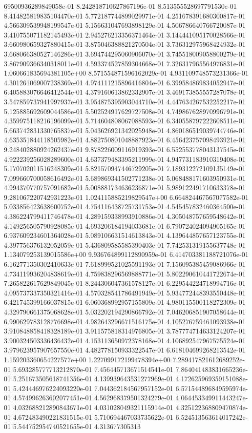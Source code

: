 69500936289849058e-01	8.242818710627867196e-01	8.513555528697791530e-01	8.414825819835104470e-01	5.772187744899029971e-01	4.251678391680300817e-01	4.566309539948199547e-01	5.156631047693898129e-01	4.506786640766720087e-01	3.410755071182145493e-01	2.945276213356371464e-01	3.144441095170028566e-01	3.660980659327880415e-01	3.875046388821270504e-01	3.736312975968424932e-01	3.668066380527146286e-01	3.694744295060906070e-01	3.745518009058800279e-01	3.867909366340318011e-01	4.593374527859304668e-01	7.326317965564976831e-01	1.060661835694381105e+00	8.571554871596162029e-01	4.931109748573231366e-01	4.301261069007238369e-01	4.974111215896416804e-01	6.399584869834052947e-01	6.405883076646412544e-01	4.379160613862332907e-01	3.469173855557287078e-01	3.547859737941997937e-01	3.954875395903044710e-01	4.447634267532252217e-01	5.125885692609044586e-01	5.502524917629727508e-01	4.749867628970996791e-01	4.359975118216196099e-01	5.714604808067088593e-01	6.340558797222608511e-01	5.663742831330765837e-01	5.043626921342025948e-01	4.860186519039744746e-01	4.635351844118505982e-01	4.882750801048887923e-01	6.456423757098493921e-01	9.248402880924262437e-01	9.878226009116919393e-01	6.552553778043137545e-01	4.922239256028289600e-01	4.637379483395211999e-01	4.947731183910319408e-01	5.170702011516248309e-01	5.821570947446729205e-01	7.189312272109135149e-01	7.099660700058616492e-01	5.689869341502771238e-01	5.068488171603950931e-01	4.994370770757091682e-01	5.008881734636236871e-01	5.989122491710633378e-01	9.281067220742931223e-01	1.024115885219829547e+00	6.664824467567077582e-01	5.033856423638600752e-01	4.754116438725731753e-01	4.545457832460364500e-01	4.386224799411746478e-01	4.289159338993910886e-01	4.305048757659548642e-01	4.149256505790928085e-01	4.693206184194033681e-01	6.790724024094905165e-01	6.937609234601364028e-01	5.089106631514613843e-01	4.139644857657123755e-01	4.397756376132052059e-01	5.436809585585390403e-01	7.742531319155637748e-01	1.134079253139015586e+00	9.936764899112890959e-01	6.414703381188721076e-01	6.162771350302410633e-01	7.618999521025591193e-01	7.156095385459086966e-01	4.734119936204838619e-01	4.759838296569888771e-01	5.802290610441722674e-01	7.265822617629849045e-01	8.244306047361578127e-01	6.229544224718994716e-01	4.095737337350321416e-01	4.570328541786491949e-01	5.934772448393550448e-01	6.421745399166037815e-01	6.060368992957155809e-01	4.980115500118272309e-01	4.329790661375068628e-01	5.032202194290866792e-01	7.046206851907058644e-01	6.990629783128776698e-01	4.982643296671516175e-01	4.105276759461093938e-01	3.910848858418328189e-01	3.911575818314976805e-01	3.787774714633124207e-01	3.900324503336436432e-01	4.153113650972378168e-01	4.106892547967575524e-01	3.979623957907657550e-01	4.482778150933322547e-01	6.618104699268213542e-01	1.159203360654227577e+00	1.227099172199478394e+00	7.289417821612689252e-01	5.693285777713212870e-01	7.456445713671514541e-01	7.864041483831665236e-01	5.251673505618741356e-01	4.139939643531277969e-01	4.172625969359151088e-01	5.424446976224093220e-01	7.044362184567957152e-01	6.571544896849595974e-01	4.574996263602077451e-01	4.562968379501324279e-01	4.064453349911443247e-01	4.032688212890843671e-01	4.031028049321115914e-01	4.325122368809470874e-01	4.672483490221831515e-01	5.710694467033735622e-01	6.524513563614017242e-01	5.544752954740521655e-01	4.313677305313